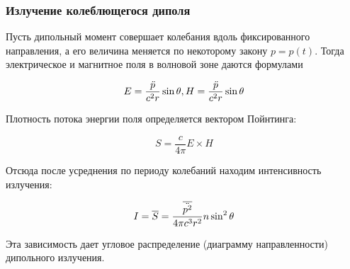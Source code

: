 \subsubsection{Излучение колеблющегося диполя}

Пусть дипольный момент совершает колебания вдоль фиксированного направления, а его величина меняется по некоторому закону $p = p(t)$. Тогда электрическое и магнитное поля в волновой зоне даются формулами

\begin{equation*}
    E = \frac{\Ddot{p}}{c^2r}\sin\theta, H = \frac{\Ddot{p}}{c^2r} \sin\theta
\end{equation*}

Плотность потока энергии поля определяется вектором Пойнтинга:

\begin{equation*}
   S = \frac{c}{4\pi} E\times H
\end{equation*}

Отсюда после усреднения по периоду колебаний находим интенсивность излучения:

\begin{equation*}
    I = \overline{S} = \frac{\overline{\Ddot{p^2}}}{4\pi c^3 r^2}n\sin^2\theta
\end{equation*}

Эта зависимость дает угловое распределение (диаграмму направленности) дипольного излучения.




